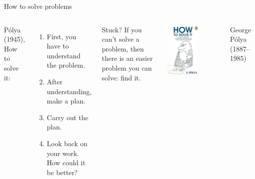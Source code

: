\documentclass[aspectratio=169,usenames,dvipsnames]{beamer}
\begin{document}
\begin{frame}{How to solve problems}
    \begin{columns}
            Pólya (1945), How to solve it:

            \begin{enumerate}
                \item First, you have to \\
                    understand the problem.
                \item After understanding, \\
                    make a plan.
                \item Carry out the plan.
                \item Look back on your work. \\
                    How could it be better?
            \end{enumerate}

            \begin{block}{Stuck?}
            If you can't solve a problem,
            then there is an easier problem you can solve:
            find it.
            \end{block}
        \centering
            \includegraphics[width=0.6\textwidth]{fig/howtosolveit}

            \vspace{1em} George P\'olya (1887--1985)
    \end{columns}
\end{frame}
\end{document}
